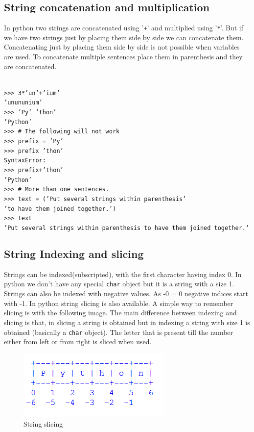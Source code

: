 \documentclass[12pt,a4paper]{article}
\begin{document}
\subsection{String concatenation and multiplication}
In python two strings are concatenated using '\texttt{+}' and multiplied using '\texttt{*}'. But if we have two strings just by placing them side by side we can concatenate them. Concatenating just by placing them side by side is not possible when variables are used. To concatenate multiple sentences place them in parenthesis and they are concatenated. 

\texttt{\\
>>> 3*'un'+'ium'\\
'unununium'\\
>>> 'Py' 'thon'\\
'Python'\\
>>> \# The following will not work\\
>>> prefix = 'Py'\\
>>> prefix 'thon'\\
SyntaxError:\\
>>> prefix+'thon'\\
'Python'\\
>>> \# More than one sentences.\\
>>> text = ('Put several strings within parenthesis'\\
 'to have them joined together.')\\
>>> text\\
'Put several strings within parenthesis to have them joined together.'\\
}
\subsection{String Indexing and slicing}
Strings can be indexed(subscripted), with the first character having index 0. In python we don't have any special \texttt{char} object but it is a string with a size 1. Strings can also be indexed with negative values. As -0 = 0 negative indices start with -1. In python string slicing is also available.  A simple way to remember slicing is with the following image. The main difference between indexing and slicing is that, in slicing a string is obtained but in indexing a string with size 1 is obtained (basically a \texttt{char} object). The letter that is present till the number either from left or from right is sliced when used.
\begin{figure}[h]
\centering
\includegraphics[scale=1]{string-slicing.png}
\caption{String slicing}
\end{figure} 
\end{document}
